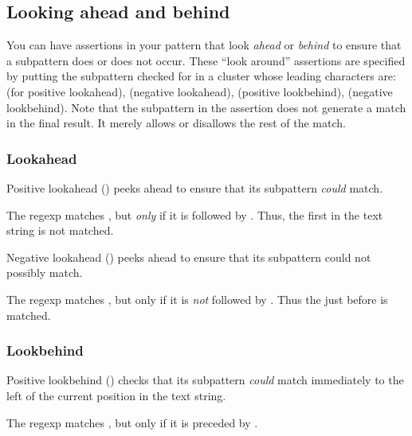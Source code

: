 {\subsection{Looking ahead and behind}

You can have assertions in your pattern that look {\em
ahead} or {\em behind} to ensure that a subpattern does
or does not occur.   These ``look around'' assertions are
specified by putting the subpattern checked for in a
cluster whose leading characters are:  (for positive
lookahead),  (negative lookahead), 
(positive lookbehind),  (negative lookbehind).
Note that the subpattern in the assertion  does not
generate a match in the final result.  It merely allows
or disallows the rest of the match.

\subsubsection{Lookahead}

Positive lookahead () peeks ahead to ensure that
its subpattern {\em could} match.


\n The regexp  matches , but
{\em only} if it is followed by .  Thus, the first
 in the text string is not matched.

Negative lookahead () peeks ahead
to ensure that its subpattern could not possibly match.


\n The regexp  matches , but
only if it is {\em not} followed by .  Thus
the  just before  is matched.

\subsubsection{Lookbehind}

Positive lookbehind () checks that its subpattern {\em could} match
immediately to the left of the current position in
the text string.


\n The regexp  matches , but only if it is
preceded by .

}
